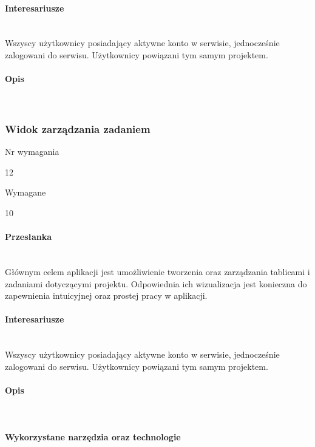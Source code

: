 \documentclass[eng,printmode]{mgr}
\begin{document}
\paragraph{Interesariusze}\ \\
Wszyscy użytkownicy posiadający aktywne konto w serwisie, jednocześnie zalogowani do serwisu. Użytkownicy powiązani tym samym projektem.

\paragraph{Opis}\ \\
\newpage

\subsubsection{Widok zarządzania zadaniem}
\begin{labeling}{Nr wymagania}
\item [Nr wymagania:] 12
\item [Typ:] Wymagane
\item [Powiązania:] 10
\end{labeling}
\paragraph{Przesłanka}\ \\
Głównym celem aplikacji jest umożliwienie tworzenia oraz zarządzania tablicami i zadaniami dotyczącymi projektu. Odpowiednia ich wizualizacja jest konieczna do zapewnienia intuicyjnej oraz prostej pracy w aplikacji.

\paragraph{Interesariusze}\ \\
Wszyscy użytkownicy posiadający aktywne konto w serwisie, jednocześnie zalogowani do serwisu. Użytkownicy powiązani tym samym projektem.

\paragraph{Opis}\ \\

\paragraph{Wykorzystane narzędzia oraz technologie}\ \\
\newpage
\end{document}
